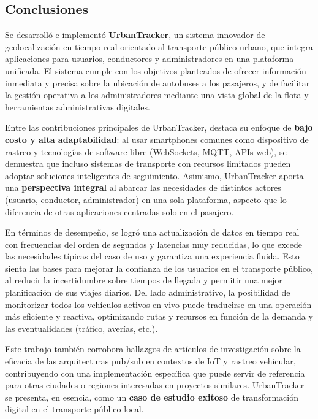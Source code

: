 \documentclass[
]{article}
\begin{document}
\subsection{Conclusiones}\label{conclusiones}

Se desarrolló e implementó \textbf{UrbanTracker}, un sistema innovador
de geolocalización en tiempo real orientado al transporte público
urbano, que integra aplicaciones para usuarios, conductores y
administradores en una plataforma unificada. El sistema cumple con los
objetivos planteados de ofrecer información inmediata y precisa sobre la
ubicación de autobuses a los pasajeros, y de facilitar la gestión
operativa a los administradores mediante una vista global de la flota y
herramientas administrativas digitales.

Entre las contribuciones principales de UrbanTracker, destaca su enfoque
de \textbf{bajo costo y alta adaptabilidad}: al usar smartphones comunes
como dispositivo de rastreo y tecnologías de software libre (WebSockets,
MQTT, APIs web), se demuestra que incluso sistemas de transporte con
recursos limitados pueden adoptar soluciones inteligentes de
seguimiento. Asimismo, UrbanTracker aporta una \textbf{perspectiva
integral} al abarcar las necesidades de distintos actores (usuario,
conductor, administrador) en una sola plataforma, aspecto que lo
diferencia de otras aplicaciones centradas solo en el pasajero.

En términos de desempeño, se logró una actualización de datos en tiempo
real con frecuencias del orden de segundos y latencias muy reducidas, lo
que excede las necesidades típicas del caso de uso y garantiza una
experiencia fluida. Esto sienta las bases para mejorar la confianza de
los usuarios en el transporte público, al reducir la incertidumbre sobre
tiempos de llegada y permitir una mejor planificación de sus viajes
diarios. Del lado administrativo, la posibilidad de monitorizar todos
los vehículos activos en vivo puede traducirse en una operación más
eficiente y reactiva, optimizando rutas y recursos en función de la
demanda y las eventualidades (tráfico, averías, etc.).

Este trabajo también corrobora hallazgos de artículos de investigación
sobre la eficacia de las arquitecturas pub/sub en contextos de IoT y
rastreo vehicular, contribuyendo con una implementación específica que
puede servir de referencia para otras ciudades o regiones interesadas en
proyectos similares. UrbanTracker se presenta, en esencia, como un
\textbf{caso de estudio exitoso} de transformación digital en el
transporte público local.
\end{document}
